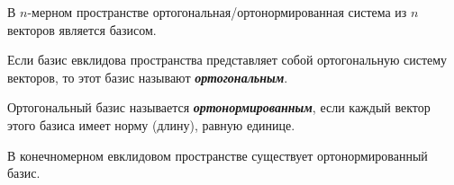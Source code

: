 \begin{corollary}
    В $n$-мерном пространстве ортогональная/ортонормированная система из $n$ векторов является базисом.
\end{corollary}

\begin{definition}
    Если базис евклидова пространства представляет собой ортогональную систему векторов, то этот базис называют \textbf{\textit{ортогональным}}.
\end{definition}

\begin{definition}
    Ортогональный базис называется \textbf{\textit{ортонормированным}}, если каждый вектор этого базиса имеет норму (длину), равную единице.
\end{definition}

\begin{theorem}
    В конечномерном евклидовом пространстве существует ортонормированный базис.
\end{theorem}
